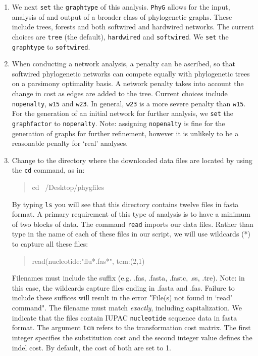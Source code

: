 \documentclass[11pt]{article}
\newcommand{\phyg}{\texttt{PhyG} }
\begin{document}
\begin{enumerate}
\item We next \texttt{set} the \texttt{graphtype} of this analysis. \phyg allows for 
the input, analysis of and output of a broader class of phylogenetic graphs. These
include trees, forests and both softwired and hardwired networks. The current choices 
are \texttt{tree} (the default), \texttt{hardwired} and \texttt{softwired}. We \texttt{set} 
the \texttt{graphtype} to \texttt{softwired}.

\item When conducting a network analysis, a penalty can be ascribed, so that 
softwired phylogenetic networks can compete equally with phylogenetic trees on 
a parsimony optimality basis. A network penalty takes into account the change in 
cost as edges are added to the tree. Current choices include \texttt{nopenalty}, 
\texttt{w15} and \texttt{w23}. In general, \texttt{w23} is a more severe penalty than
\texttt{w15}. For the generation of an initial network for further analysis, we 
\texttt{set} the \texttt{graphfactor} to \texttt{nopenalty}. Note: assigning \texttt{nopenalty}
is fine for the generation of graphs for further refinement, however it is unlikely 
to be a reasonable penalty for `real' analyses.

\item Change to the directory where the downloaded data files are located by using the 
\texttt{cd} command, as in:
		
	\begin{quote}
	cd ~/Desktop/phygfiles
	\end{quote}

By typing \texttt{ls} you will see that this directory contains twelve files in fasta format.
A primary requirement of this type of analysis is to have a minimum of two blocks of 
data. The command \texttt{read} imports our data files. Rather than type in the name 
of each of these files in our script, we will use wildcards (*) to capture all these files: 
        
        \begin{quote}
	read(nucleotide:"flu*.fas*", tcm:(2,1)\\
	\end{quote}

Filenames must include the suffix (e.g. .fas, .fasta, .fastc, .ss, .tre). Note: in this case, 
the wildcards capture files ending in .fasta and .fas. Failure to include these suffices 
will result in the error "File(s) not found in `read' command". The filename must match 
\textit{exactly}, including capitalization. We indicate that the files contain IUPAC 
\texttt{nucleotide} sequence data in fasta format. The argument \texttt{tcm} refers to 
the transformation cost matrix. The first integer specifies the substitution cost and the 
second integer value defines the indel cost. By default, the cost of both are set to 1.


\end{enumerate}
\end{document}
